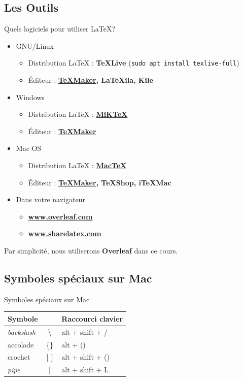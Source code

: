 \documentclass[10pt,svgnames,usenames,table]{beamer} %
\begin{document}
\subsection{Les Outils}
\begin{frame}{Quels logiciels pour utiliser \LaTeX{}?}

  \begin{itemize}
	  \item GNU/Linux
	  \begin{itemize}
	  	\item Distribution \LaTeX{} : \textbf{TeXLive}
          {\tiny (\lstinline|sudo apt install texlive-full|)}
		\item Éditeur : \textbf{
            \href{http://www.xm1math.net/texmaker/}{TeXMaker}, LaTeXila, Kile}
	  \end{itemize}
	  \item Windows
	  \begin{itemize}
        \item Distribution \LaTeX{} : \textbf{\href{https://miktex.org/}{MiKTeX}}
        \item Éditeur : \textbf{\href{http://www.xm1math.net/texmaker/}{TeXMaker}}
	  \end{itemize}
	  \item Mac OS
	  \begin{itemize}
        \item Distribution \LaTeX{} : \textbf{\href{https://www.tug.org/mactex/}{MacTeX}}
		\item Éditeur : \textbf{\href{http://www.xm1math.net/texmaker/}{TeXMaker}, TeXShop, iTeXMac}
	  \end{itemize}
	  \item Dans votre navigateur
	  \begin{itemize}
		\item \textbf{\url{www.overleaf.com}}
  		\item \textbf{\url{www.sharelatex.com}}
	  \end{itemize}
  \end{itemize}
  Par simplicité, nous utiliserons \textbf{Overleaf} dans ce cours.
\end{frame}

\subsection{Symboles spéciaux sur Mac}
\begin{frame}{Symboles spéciaux sur Mac}
  \begin{center}
    \begin{tabular}{|lc|l|}
      \hline
      Symbole & & Raccourci clavier \\\hline
      \textit{backslash} & \textbackslash & alt + shift + / \\
      accolade & \{\} & alt + () \\
      crochet & $[]$ & alt + shift + () \\
      \textit{pipe} & | & alt + shift + L \\
      \hline
    \end{tabular}
  \end{center}
\end{frame}
\end{document}
